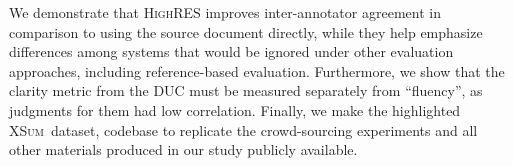 \documentclass[11pt,a4paper]{article}
\newcommand\highres{\textsc{HighRES}}
\newcommand\xsum{\textsc{XSum}}
\begin{document}
We demonstrate that \highres{} improves inter-annotator agreement in comparison to using the source document directly, while they help emphasize differences among systems that would be ignored under other evaluation approaches, including reference-based evaluation. Furthermore, we show that the clarity metric from the DUC \citep{dang2005overview} must be measured separately from ``fluency'', as judgments for them had low correlation. %
Finally, we make the highlighted \xsum\ dataset, codebase to replicate the crowd-sourcing experiments and all other materials produced in our study publicly available.
\begin{table}[t!]
\centering
\small
\begin{tabular}{r | c | c c c c c c c | c c | c c r}


\end{tabular}
\end{table}
\end{document}
